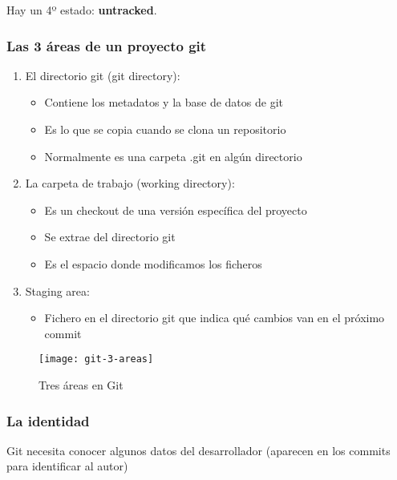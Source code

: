 \par Hay un 4º estado: \textbf{untracked}.

\subsubsection{Las 3 áreas de un proyecto git}
\label{subs:git-3-areas}

\begin{enumerate}
    \item El directorio git (git directory):
        \begin{itemize}
            \item Contiene los metadatos y la base de datos de git
            \item Es lo que se copia cuando se clona un repositorio
            \item Normalmente es una carpeta .git en algún directorio
        \end{itemize}
    \item La carpeta de trabajo (working directory):
        \begin{itemize}
            \item Es un checkout de una versión específica del proyecto
            \item Se extrae del directorio git
            \item Es el espacio donde modificamos los ficheros
        \end{itemize}
    \item Staging area:
        \begin{itemize}
            \item Fichero en el directorio git que indica qué cambios van en el próximo commit
        \end{itemize}
\end{enumerate}

\begin{figure}[H]
    \centering
    \texttt{[image: git-3-areas]}
    \caption{Tres áreas en Git}
    \label{fig:git-3-areas}
\end{figure}

\subsubsection{La identidad}
\label{subs:git-identidad}

\par Git necesita conocer algunos datos del desarrollador (aparecen en los commits para identificar al autor)

